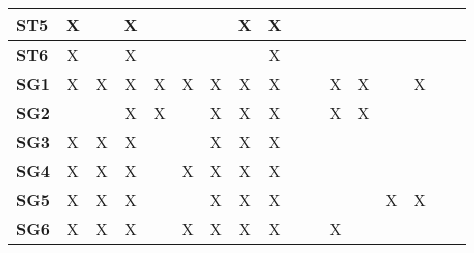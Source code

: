 \documentclass[12pt]{article}
\begin{document}
\begin{table}[H]
\begin{adjustwidth}{-0.1in}{-1in}
{\begin{tabular}{c|c|c|c|c|c|c|c|c|c|c|c|c|c|c|c|c|}
\multicolumn{1}{|l|}{\textbf{ST5}}   &      X       &              &       X      &              &              &              &       X      &       X      &              &              &              &              &              &              &              &               \\ \hline
\multicolumn{1}{|l|}{\textbf{ST6}}   &      X       &              &       X      &              &              &              &              &       X      &              &              &              &              &              &              &              &               \\ \hline
\multicolumn{1}{|l|}{\textbf{SG1}}   &      X       &      X       &       X      &       X      &       X      &      X       &       X      &       X      &              &              &      X       &      X       &              &      X       &              &               \\ \hline
\multicolumn{1}{|l|}{\textbf{SG2}}   &              &              &       X      &       X       &             &      X       &       X      &       X      &              &              &      X       &     X        &              &              &              &               \\ \hline
\multicolumn{1}{|l|}{\textbf{SG3}}   &      X       &      X       &       X      &              &              &      X       &       X      &       X      &              &              &              &              &              &              &              &               \\ \hline
\multicolumn{1}{|l|}{\textbf{SG4}}   &      X       &      X       &       X      &              &       X      &      X       &       X      &       X      &              &              &              &              &              &              &              &               \\ \hline
\multicolumn{1}{|l|}{\textbf{SG5}}   &      X       &      X       &       X      &              &              &      X       &       X      &       X      &              &              &              &              &       X      &       X      &              &               \\ \hline
\multicolumn{1}{|l|}{\textbf{SG6}}   &      X       &      X       &       X      &              &       X      &      X       &       X      &       X      &              &              &       X      &              &              &              &              &               \\ \hline

\end{tabular}}
\end{adjustwidth}
\end{table}
\end{document}
